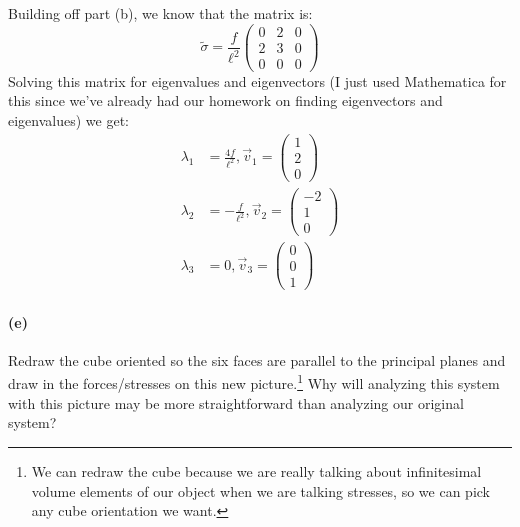 \documentclass{article}
\begin{document}
\begin{solution}
	Building off part (b), we know that the matrix is:
	\[
		\tilde \sigma = \frac{f}{\ell^2}\begin{pmatrix} 0 & 2 & 0\\ 2 & 3 & 0 \\ 0 & 0 & 0 \end{pmatrix} 
	\] 
	Solving this matrix for eigenvalues and eigenvectors (I just used Mathematica for this since we've
	already had our homework on finding eigenvectors and eigenvalues) we get: 
	\begin{align*}
		\lambda_1 &= \frac{4f}{\ell^2}, \vec v_1 = \begin{pmatrix} 1 \\2\\0 \end{pmatrix} \\
		\lambda_2 &= -\frac{f}{\ell^2}, \vec v_2 = \begin{pmatrix} -2 \\ 1 \\0 \end{pmatrix} \\
		\lambda_3 &= 0, \vec v_3 = \begin{pmatrix} 0 \\ 0 \\ 1 \end{pmatrix}  
	\end{align*}
\end{solution}
\paragraph{(e)}		\extrapart
Redraw the cube oriented so the six faces are parallel to the principal planes and draw in the forces/stresses on this new picture.\footnote{We can redraw the cube because we are 
really talking about infinitesimal volume elements of our object when we are talking stresses, 
so we can pick any cube orientation we want.}
Why will analyzing this system with this picture may be more straightforward than analyzing our original system?

\phline
\end{document}
